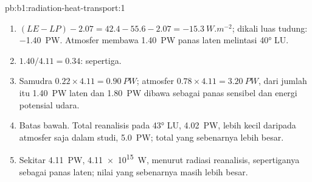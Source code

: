 \begin{solution}{pb:b1:radiation-heat-transport:1}
\begin{enumerate}
        daripada $LE = \qty{42.4}{W.m^{-2}}$: lebih banyak air jatuh di tudung daripada yang
        menguap darinya; selisihnya tiba sebagai uap.
  \item $(LE - LP) - 2.07 = 42.4 - 55.6 - 2.07 = \qty{-15.3}{W.m^{-2}}$; dikali
        luas tudung: \qty{-1.40}{PW}. Atmosfer membawa \qty{1.40}{PW}
        panas laten melintasi \ang{40} LU.
  \item $1.40/4.11 = 0.34$: sepertiga.
  \item Samudra $0.22 \times 4.11 = \qty{0.90}{PW}$; atmosfer $0.78 \times 4.11 =
        \qty{3.20}{PW}$, dari jumlah itu \qty{1.40}{PW} laten dan \qty{1.80}{PW}
        dibawa sebagai panas sensibel dan energi potensial udara.
  \item Batas bawah. Total reanalisis pada \ang{43} LU, \qty{4.02}{PW}, lebih kecil
        daripada atmosfer saja dalam studi, \qty{5.0}{PW}; total yang sebenarnya
        lebih besar.
  \item Sekitar \qty{4.11}{PW}, \qty{4.11e15}{W}, menurut radiasi reanalisis, sepertiganya
        sebagai panas laten; nilai yang sebenarnya masih lebih besar.
\end{enumerate}
\end{solution}
